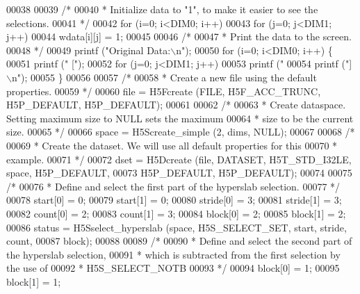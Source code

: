 \begin{DoxyCode}
00038 
00039     \textcolor{comment}{/*}
00040 \textcolor{comment}{     * Initialize data to "1", to make it easier to see the selections.}
00041 \textcolor{comment}{     */}
00042     \textcolor{keywordflow}{for} (i=0; i<DIM0; i++)
00043         \textcolor{keywordflow}{for} (j=0; j<DIM1; j++)
00044             wdata[i][j] = 1;
00045 
00046     \textcolor{comment}{/*}
00047 \textcolor{comment}{     * Print the data to the screen.}
00048 \textcolor{comment}{     */}
00049     printf (\textcolor{stringliteral}{"Original Data:\(\backslash\)n"});
00050     \textcolor{keywordflow}{for} (i=0; i<DIM0; i++) \{
00051         printf (\textcolor{stringliteral}{" ["});
00052         \textcolor{keywordflow}{for} (j=0; j<DIM1; j++)
00053             printf (\textcolor{stringliteral}{" %
00054         printf (\textcolor{stringliteral}{"]\(\backslash\)n"});
00055     \}
00056 
00057     \textcolor{comment}{/*}
00058 \textcolor{comment}{     * Create a new file using the default properties.}
00059 \textcolor{comment}{     */}
00060     file = H5Fcreate (FILE, H5F\_ACC\_TRUNC, H5P\_DEFAULT, H5P\_DEFAULT);
00061 
00062     \textcolor{comment}{/*}
00063 \textcolor{comment}{     * Create dataspace.  Setting maximum size to NULL sets the maximum}
00064 \textcolor{comment}{     * size to be the current size.}
00065 \textcolor{comment}{     */}
00066     space = H5Screate\_simple (2, dims, NULL);
00067 
00068     \textcolor{comment}{/*}
00069 \textcolor{comment}{     * Create the dataset.  We will use all default properties for this}
00070 \textcolor{comment}{     * example.}
00071 \textcolor{comment}{     */}
00072     dset = H5Dcreate (file, DATASET, H5T\_STD\_I32LE, space, H5P\_DEFAULT,
00073                 H5P\_DEFAULT, H5P\_DEFAULT);
00074 
00075     \textcolor{comment}{/*}
00076 \textcolor{comment}{     * Define and select the first part of the hyperslab selection.}
00077 \textcolor{comment}{     */}
00078     start[0] = 0;
00079     start[1] = 0;
00080     stride[0] = 3;
00081     stride[1] = 3;
00082     count[0] = 2;
00083     count[1] = 3;
00084     block[0] = 2;
00085     block[1] = 2;
00086     status = H5Sselect\_hyperslab (space, H5S\_SELECT\_SET, start, stride, count,
00087                 block);
00088 
00089     \textcolor{comment}{/*}
00090 \textcolor{comment}{     * Define and select the second part of the hyperslab selection,}
00091 \textcolor{comment}{     * which is subtracted from the first selection by the use of}
00092 \textcolor{comment}{     * H5S\_SELECT\_NOTB}
00093 \textcolor{comment}{     */}
00094     block[0] = 1;
00095     block[1] = 1;
}
\end{DoxyCode}
